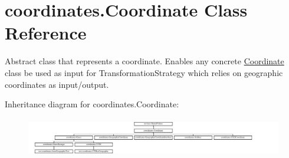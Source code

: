 \hypertarget{classcoordinates_1_1_coordinate}{}\section{coordinates.\+Coordinate Class Reference}
\label{classcoordinates_1_1_coordinate}


Abstract class that represents a coordinate. Enables any concrete \hyperlink{classcoordinates_1_1_coordinate}{Coordinate} class be used as input for Transformation\+Strategy which relies on geographic coordinates as input/output.  


Inheritance diagram for coordinates.\+Coordinate\+:\begin{figure}[H]
\begin{center}
\leavevmode
\includegraphics[height=1.741294cm]{classcoordinates_1_1_coordinate}
\end{center}
\end{figure}
